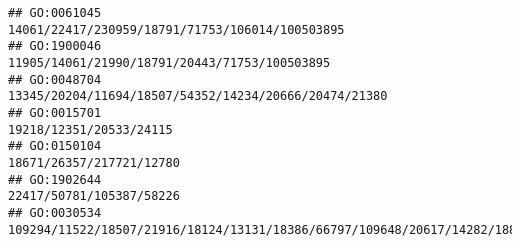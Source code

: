 \documentclass[
]{article}
\begin{document}
\begin{verbatim}
## GO:0061045                                                                                                                                                                                                                                                                                                                                                              14061/22417/230959/18791/71753/106014/100503895
## GO:1900046                                                                                                                                                                                                                                                                                                                                                                11905/14061/21990/18791/20443/71753/100503895
## GO:0048704                                                                                                                                                                                                                                                                                                                                                        13345/20204/11694/18507/54352/14234/20666/20474/21380
## GO:0015701                                                                                                                                                                                                                                                                                                                                                                                      19218/12351/20533/24115
## GO:0150104                                                                                                                                                                                                                                                                                                                                                                                     18671/26357/217721/12780
## GO:1902644                                                                                                                                                                                                                                                                                                                                                                                     22417/50781/105387/58226
## GO:0030534                                                                                                                                                                                                                                                                                                                              109294/11522/18507/21916/18124/13131/18386/66797/109648/20617/14282/18858/14169

\end{verbatim}
\end{document}
